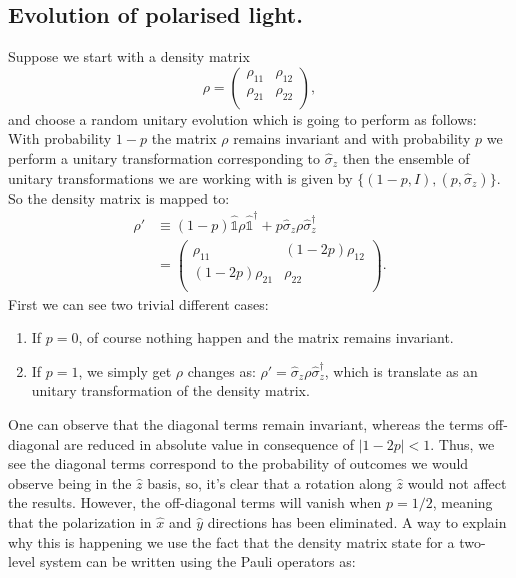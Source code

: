 \begin{appendix}
\subsection{Evolution of polarised light.}
Suppose we start with a density matrix
\[
\rho=
  \left( 
  {\begin{array}{cc}
   \rho_{11} & \rho_{12} \\
   \rho_{21} & \rho_{22} \\
  \end{array} }
   \right),
\]
and choose a random unitary evolution which is going to perform as follows: With probability $1-p$ the matrix $\rho$ remains invariant and with probability $p$ we perform a unitary transformation corresponding to $\hat{\sigma}_z$%
then the ensemble of unitary transformations we are working with is given by $\{(1-p,I),(p,\hat{\sigma}_z)\}$. So the density matrix is mapped to:
\begin{align*}
\rho ' &\equiv (1-p)\hat{\mathds{1}}\rho \hat{\mathds{1}}^{\dagger} + p\hat{\sigma}_z \rho \hat{\sigma}_z^{\dagger}\\[0.5cm]
&=\left(
{\begin{array}{cc}
\rho_{11} & (1-2p)\rho_{12} \\
(1-2p)\rho_{21} & \rho_{22} \\
\end{array}
}
\right).
\end{align*}
First we can see two trivial different cases:
\begin{enumerate}
\item If $p=0$, of course nothing happen and the matrix remains invariant.
\item If $p=1$, we simply get $\rho$ changes as: $\rho'=\hat{\sigma}_z \rho \hat{\sigma}_z^{\dagger}$, which is translate as an unitary transformation of the density matrix.
\end{enumerate}
One can observe that the diagonal terms remain invariant, whereas the terms off-diagonal are reduced in absolute value in consequence of $\mid1-2p\mid<1$. Thus, we see the diagonal terms correspond to the probability of outcomes we would observe being in the $\hat{z}$ basis, so, it's clear that a rotation along $\hat{z}$ would not affect the results. However, the off-diagonal terms will vanish when $p=1/2$, meaning that the polarization in $\hat{x}$ and $\hat{y}$ directions has been eliminated. A way to explain why this is happening we use the fact that  the density matrix state for a two-level system can be written using the Pauli operators as:

\end{appendix}
